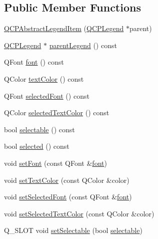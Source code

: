 \subsection*{Public Member Functions}
\begin{DoxyCompactItemize}
\item 
\hyperlink{class_q_c_p_abstract_legend_item_afaff87610e8da0fa238ecf552872d774}{Q\+C\+P\+Abstract\+Legend\+Item} (\hyperlink{class_q_c_p_legend}{Q\+C\+P\+Legend} $\ast$parent)
\item 
\hyperlink{class_q_c_p_legend}{Q\+C\+P\+Legend} $\ast$ \hyperlink{class_q_c_p_abstract_legend_item_a15709a3f6b2ce3946261fe90422ae32e}{parent\+Legend} () const
\item 
Q\+Font \hyperlink{class_q_c_p_abstract_legend_item_a699b18e1d9e70372e51e75f462dbb643}{font} () const
\item 
Q\+Color \hyperlink{class_q_c_p_abstract_legend_item_a35b35fa697dcece86cf7e5818c0820b2}{text\+Color} () const
\item 
Q\+Font \hyperlink{class_q_c_p_abstract_legend_item_ace98814b31762578228f6b32111cd3c0}{selected\+Font} () const
\item 
Q\+Color \hyperlink{class_q_c_p_abstract_legend_item_a09540594509fb0074f3a1b39548e3bdc}{selected\+Text\+Color} () const
\item 
bool \hyperlink{class_q_c_p_abstract_legend_item_af054a668038bcd7e35a35a07d1e79a23}{selectable} () const
\item 
bool \hyperlink{class_q_c_p_abstract_legend_item_adf427dbb05d5f1a8e84c6abcb05becdf}{selected} () const
\item 
void \hyperlink{class_q_c_p_abstract_legend_item_a409c53455d8112f71d70c0c43eb10265}{set\+Font} (const Q\+Font \&\hyperlink{class_q_c_p_abstract_legend_item_a699b18e1d9e70372e51e75f462dbb643}{font})
\item 
void \hyperlink{class_q_c_p_abstract_legend_item_a6ebace6aaffaedcdab2d74e88acc2d1e}{set\+Text\+Color} (const Q\+Color \&color)
\item 
void \hyperlink{class_q_c_p_abstract_legend_item_a91db5aee48617a9d3206e61376807365}{set\+Selected\+Font} (const Q\+Font \&\hyperlink{class_q_c_p_abstract_legend_item_a699b18e1d9e70372e51e75f462dbb643}{font})
\item 
void \hyperlink{class_q_c_p_abstract_legend_item_a4d01d008ee1a5bfe9905b0397a421936}{set\+Selected\+Text\+Color} (const Q\+Color \&color)
\item 
Q\+\_\+\+S\+L\+OT void \hyperlink{class_q_c_p_abstract_legend_item_a9913ef48730551b696e7f98a2391c599}{set\+Selectable} (bool \hyperlink{class_q_c_p_abstract_legend_item_af054a668038bcd7e35a35a07d1e79a23}{selectable})

\end{DoxyCompactItemize}
